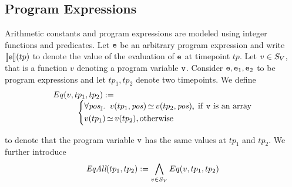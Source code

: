 \subsection{Program Expressions}\label{sec:exp}
Arithmetic constants and program expressions are modeled using integer
functions and predicates.
Let $\texttt{e}$ be an arbitrary program expression and write $\llbracket \texttt{e} \rrbracket (tp)$ to denote 
the value of the evaluation of $\texttt{e}$ at timepoint $tp$. 
%
Let $v\in S_V$, that is a function $v$ denoting a program variable
$\texttt{v}$. Consider $\texttt{e},\texttt{e}_1,\texttt{e}_2$ to be program
expressions and 
let $tp_1, tp_2$ denote two timepoints. We define 
\begin{equation*} \label{eq:eq:expressions}
\begin{array}{l}
Eq(v,tp_1,tp_2):= 
\\
\qquad\quad\left\{
\begin{aligned}
&\forall \mathit{pos}_{\mathbb{I}}. \;\;v(tp_1, \mathit{pos}) {\,\simeq\,} v(tp_2, \mathit{pos}), \hspace{-0.5em}, \text{ if \texttt{v} is an array}\\&
v(tp_1) {\,\simeq\,} v(tp_2), \text{otherwise}
\end{aligned}
\right.
\end{array}
\end{equation*}

to denote that the program variable $\texttt{v}$ has the same values at
$tp_1$ and $tp_2$.  
We further introduce
\begin{equation*}\label{eq:eqall:expressions}
\textit{EqAll}(tp_1,tp_2) := \bigwedge_{v \in S_V} Eq(v,tp_1,tp_2)
\end{equation*}

